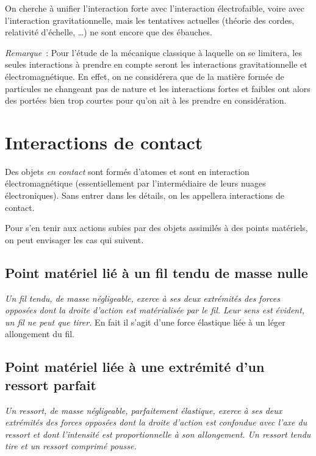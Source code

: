 On cherche à unifier l'interaction forte avec l'interaction électrofaible,
voire avec l'interaction gravitationnelle, mais les tentatives actuelles
(théorie des cordes, relativité d'échelle, \ldots) ne sont encore que des
ébauches.

\emph{Remarque}~: Pour l'étude de la mécanique classique à laquelle on se
limitera, les seules interactions à prendre en compte seront les interactions
gravitationnelle et électromagnétique. En effet, on ne considérera que de la
matière formée de particules ne changeant pas de nature et les interactions
fortes et faibles ont alors des portées bien trop courtes pour qu'on ait à
les prendre en considération.

\section{Interactions de contact}
\label{chap2-sec:interactiondecontac}

Des objets \emph{en contact} sont formés d'atomes et sont en interaction
électromagnétique (essentiellement par l'intermédiaire de leurs nuages
électroniques). Sans entrer dans les détails, on les appellera interactions
de contact.

Pour s'en tenir aux actions subies par des objets assimilés à des points
matériels, on peut envisager les cas qui suivent.

\subsection{Point matériel lié à un fil tendu de masse nulle}
\label{chap2-subsec:filtendu}

\emph{Un fil tendu, de masse négligeable, exerce à ses deux extrémités des
forces opposées dont la droite d'action est matérialisée par le fil. Leur
sens est évident, un fil ne peut que tirer.} En fait il s'agit d'une force
élastique liée à un léger allongement du fil.

\subsection{Point matériel liée à une extrémité d'un ressort parfait}
\label{chap2-subsec:ressort}

\emph{Un ressort, de masse négligeable, parfaitement élastique, exerce à ses
deux extrémités des forces opposées dont la droite d'action est confondue
avec l'axe du ressort et dont l'intensité est proportionnelle à son
allongement. Un ressort tendu tire et un ressort comprimé pousse.}


